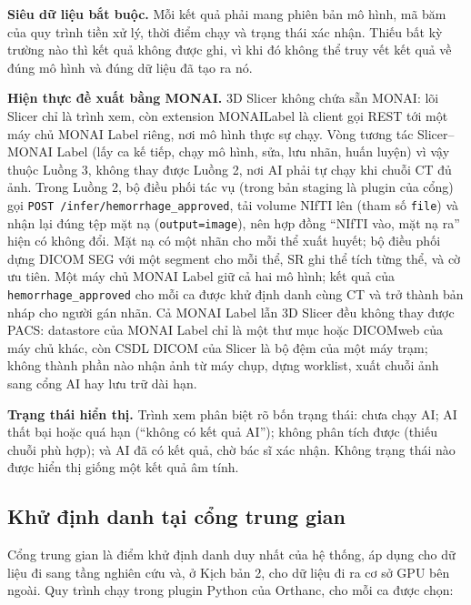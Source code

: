 \textbf{Siêu dữ liệu bắt buộc.} Mỗi kết quả phải mang phiên bản mô hình, mã băm của quy
trình tiền xử lý, thời điểm chạy và trạng thái xác nhận. Thiếu bất kỳ trường nào thì kết
quả không được ghi, vì khi đó không thể truy vết kết quả về đúng mô hình và đúng dữ liệu
đã tạo ra nó.

\textbf{Hiện thực đề xuất bằng MONAI.} 3D Slicer không chứa sẵn MONAI: lõi Slicer chỉ
là trình xem, còn extension MONAILabel là client gọi REST tới một máy chủ MONAI Label
riêng, nơi mô hình thực sự chạy. Vòng tương tác Slicer--MONAI Label (lấy ca kế tiếp,
chạy mô hình, sửa, lưu nhãn, huấn luyện) vì vậy thuộc Luồng 3, không thay được Luồng 2,
nơi AI phải tự chạy khi chuỗi CT đủ ảnh. Trong Luồng 2, bộ điều phối tác vụ (trong bản staging là plugin của cổng) gọi
\texttt{POST /infer/hemorrhage\_approved}, tải volume NIfTI lên (tham số
\texttt{file}) và nhận lại đúng tệp mặt nạ (\texttt{output=image}), nên hợp đồng ``NIfTI
vào, mặt nạ ra'' hiện có không đổi. Mặt nạ có một nhãn cho mỗi thể xuất huyết; bộ điều phối
dựng DICOM SEG với một segment cho mỗi thể, SR ghi thể tích từng thể, và cờ ưu tiên.
Một máy chủ MONAI Label giữ cả hai mô hình; kết quả của \texttt{hemorrhage\_approved} cho mỗi ca
được khử định danh cùng CT và trở thành bản nháp cho người gán nhãn.
Cả MONAI Label lẫn 3D Slicer đều không thay được PACS: datastore của MONAI Label chỉ là
một thư mục hoặc DICOMweb của máy chủ khác, còn CSDL DICOM của Slicer là bộ đệm của một
máy trạm; không thành phần nào nhận ảnh từ máy chụp, dựng worklist, xuất chuỗi ảnh sang
cổng AI hay lưu trữ dài hạn.

\textbf{Trạng thái hiển thị.} Trình xem phân biệt rõ bốn trạng thái: chưa chạy AI; AI
thất bại hoặc quá hạn (``không có kết quả AI''); không phân tích được (thiếu chuỗi phù
hợp); và AI đã có kết quả, chờ bác sĩ xác nhận. Không trạng thái nào được hiển thị giống
một kết quả âm tính.

\subsection{Khử định danh tại cổng trung gian}
\label{sec:archdeid}

Cổng trung gian là điểm khử định danh duy nhất của hệ thống, áp dụng cho dữ liệu đi sang
tầng nghiên cứu và, ở Kịch bản 2, cho dữ liệu đi ra cơ sở GPU bên ngoài. Quy trình chạy
trong plugin Python của Orthanc, cho mỗi ca được chọn:

